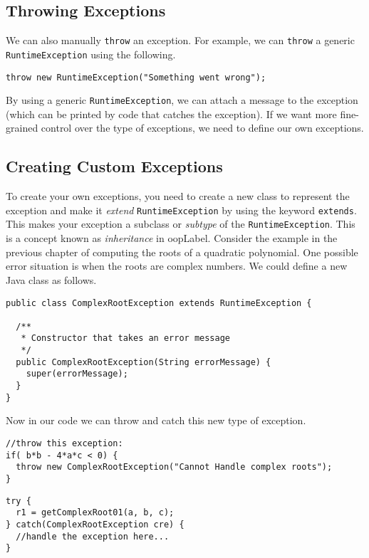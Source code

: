 \subsection{Throwing Exceptions}

We can also manually \texttt{throw} an exception.  
For example, we can \texttt{throw}
a generic \texttt{RuntimeException} using the following.

\begin{verbatim}
throw new RuntimeException("Something went wrong");
\end{verbatim}

By using a generic \texttt{RuntimeException}, we
can attach a message to the exception (which can be
printed by code that catches the exception).  If we want
more fine-grained control over the type of exceptions, we
need to define our own exceptions.

\subsection{Creating Custom Exceptions}

To create your own exceptions, you need to create a new
class to represent the exception and make it \emph{extend} 
\texttt{RuntimeException} by using the keyword
\texttt{extends}.  This makes your exception a 
subclass or \emph{subtype} of the \texttt{RuntimeException}.
This is a concept known as \emph{inheritance} in \gls{oopLabel}.
Consider the example in the previous chapter of computing
the roots of a quadratic polynomial.  One possible error 
situation is when the roots are complex numbers.  We could
define a new Java class as follows.

\begin{verbatim}
public class ComplexRootException extends RuntimeException {

  /**
   * Constructor that takes an error message
   */
  public ComplexRootException(String errorMessage) {
    super(errorMessage);
  }
}
\end{verbatim}

Now in our code we can throw and catch this new type of exception.

\begin{verbatim}
//throw this exception:
if( b*b - 4*a*c < 0) {
  throw new ComplexRootException("Cannot Handle complex roots");
}
\end{verbatim}

\begin{verbatim}
try {
  r1 = getComplexRoot01(a, b, c);
} catch(ComplexRootException cre) {
  //handle the exception here...
}
\end{verbatim}


